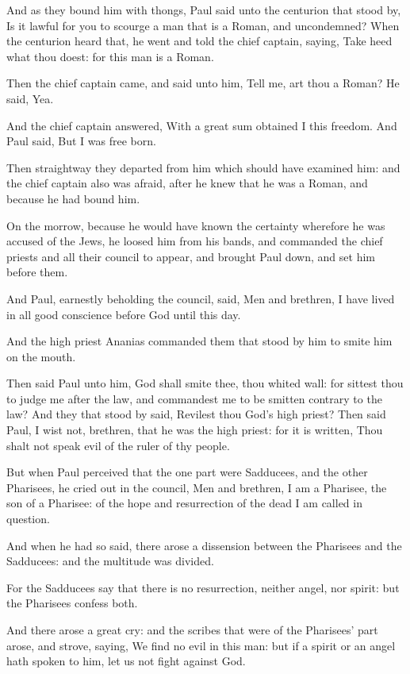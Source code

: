\Verse And as they bound him with thongs, Paul said unto the centurion that stood by, Is it lawful for you to scourge a man that is a Roman, and uncondemned?  \Verse When the centurion heard that, he went and told the chief captain, saying, Take heed what thou doest: for this man is a Roman.

\Verse Then the chief captain came, and said unto him, Tell me, art thou a Roman? He said, Yea.

\Verse And the chief captain answered, With a great sum obtained I this freedom. And Paul said, But I was free born.

\Verse Then straightway they departed from him which should have examined him: and the chief captain also was afraid, after he knew that he was a Roman, and because he had bound him.

\Verse On the morrow, because he would have known the certainty wherefore he was accused of the Jews, he loosed him from his bands, and commanded the chief priests and all their council to appear, and brought Paul down, and set him before them.


\Chapter
\Verse And Paul, earnestly beholding the council, said, Men and brethren, I have lived in all good conscience before God until this day.

\Verse And the high priest Ananias commanded them that stood by him to smite him on the mouth.

\Verse Then said Paul unto him, God shall smite thee, thou whited wall: for sittest thou to judge me after the law, and commandest me to be smitten contrary to the law?  \Verse And they that stood by said, Revilest thou God's high priest?  \Verse Then said Paul, I wist not, brethren, that he was the high priest: for it is written, Thou shalt not speak evil of the ruler of thy people.

\Verse But when Paul perceived that the one part were Sadducees, and the other Pharisees, he cried out in the council, Men and brethren, I am a Pharisee, the son of a Pharisee: of the hope and resurrection of the dead I am called in question.

\Verse And when he had so said, there arose a dissension between the Pharisees and the Sadducees: and the multitude was divided.

\Verse For the Sadducees say that there is no resurrection, neither angel, nor spirit: but the Pharisees confess both.

\Verse And there arose a great cry: and the scribes that were of the Pharisees' part arose, and strove, saying, We find no evil in this man: but if a spirit or an angel hath spoken to him, let us not fight against God.

